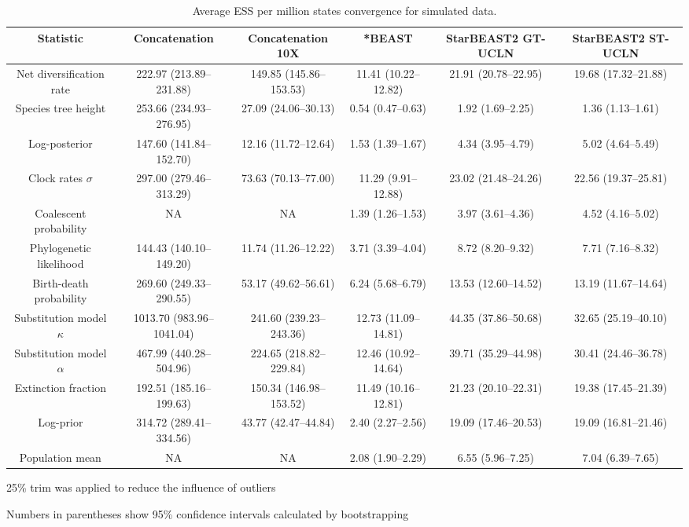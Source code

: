 \documentclass[12pt]{article}
\begin{document}
\begin{landscape}
\clearpage

\begin{table}[htb!]
\centering
\caption{Average ESS per million states convergence for simulated data.}
\label{tab:simulatedPerMstates}
\begin{threeparttable}
\begin{adjustbox}{center}
\renewcommand{\arraystretch}{1.2}
\footnotesize
\begin{tabular}{|c|c|c|c|c|c|}
\multicolumn{1}{c}{Statistic} & \multicolumn{1}{c}{Concatenation} & \multicolumn{1}{c}{Concatenation 10X} & \multicolumn{1}{c}{*BEAST} & \multicolumn{1}{c}{StarBEAST2 GT-UCLN} & \multicolumn{1}{c}{StarBEAST2 ST-UCLN}\tabularnewline
\hline
Net diversification rate & 222.97 (213.89--231.88) & 149.85 (145.86--153.53) & 11.41 (10.22--12.82) & 21.91 (20.78--22.95) & 19.68 (17.32--21.88)\tabularnewline
\hline
Species tree height & 253.66 (234.93--276.95) & 27.09 (24.06--30.13) & 0.54 (0.47--0.63) & 1.92 (1.69--2.25) & 1.36 (1.13--1.61)\tabularnewline
\hline
Log-posterior & 147.60 (141.84--152.70) & 12.16 (11.72--12.64) & 1.53 (1.39--1.67) & 4.34 (3.95--4.79) & 5.02 (4.64--5.49)\tabularnewline
\hline
Clock rates $\sigma$ & 297.00 (279.46--313.29) & 73.63 (70.13--77.00) & 11.29 (9.91--12.88) & 23.02 (21.48--24.26) & 22.56 (19.37--25.81)\tabularnewline
\hline
Coalescent probability & NA & NA & 1.39 (1.26--1.53) & 3.97 (3.61--4.36) & 4.52 (4.16--5.02)\tabularnewline
\hline
Phylogenetic likelihood & 144.43 (140.10--149.20) & 11.74 (11.26--12.22) & 3.71 (3.39--4.04) & 8.72 (8.20--9.32) & 7.71 (7.16--8.32)\tabularnewline
\hline
Birth-death probability & 269.60 (249.33--290.55) & 53.17 (49.62--56.61) & 6.24 (5.68--6.79) & 13.53 (12.60--14.52) & 13.19 (11.67--14.64)\tabularnewline
\hline
Substitution model $\kappa$ & 1013.70 (983.96--1041.04) & 241.60 (239.23--243.36) & 12.73 (11.09--14.81) & 44.35 (37.86--50.68) & 32.65 (25.19--40.10)\tabularnewline
\hline
Substitution model $\alpha$ & 467.99 (440.28--504.96) & 224.65 (218.82--229.84) & 12.46 (10.92--14.64) & 39.71 (35.29--44.98) & 30.41 (24.46--36.78)\tabularnewline
\hline
Extinction fraction & 192.51 (185.16--199.63) & 150.34 (146.98--153.52) & 11.49 (10.16--12.81) & 21.23 (20.10--22.31) & 19.38 (17.45--21.39)\tabularnewline
\hline
Log-prior & 314.72 (289.41--334.56) & 43.77 (42.47--44.84) & 2.40 (2.27--2.56) & 19.09 (17.46--20.53) & 19.09 (16.81--21.46)\tabularnewline
\hline
Population mean & NA & NA & 2.08 (1.90--2.29) & 6.55 (5.96--7.25) & 7.04 (6.39--7.65)\tabularnewline
\hline
\end{tabular}
\end{adjustbox}
\begin{tablenotes}
\footnotesize
\item 25\% trim was applied to reduce the influence of outliers
\item Numbers in parentheses show 95\% confidence intervals calculated by bootstrapping
\end{tablenotes}
\end{threeparttable}
\end{table}

\end{landscape}
\end{document}

